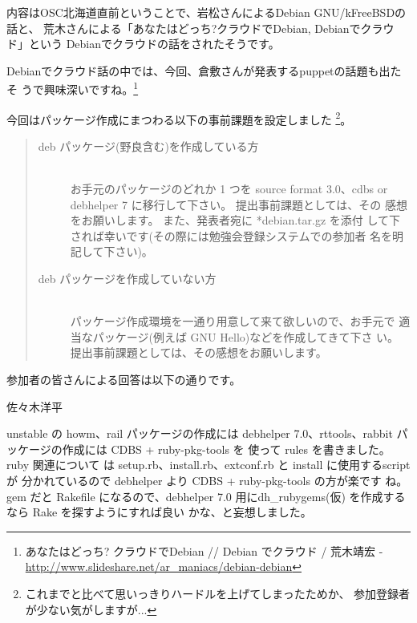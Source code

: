 \documentclass[mingoth,a4paper]{jsarticle}
\begin{document}
内容はOSC北海道直前ということで、岩松さんによるDebian GNU/kFreeBSDの話と、
荒木さんによる「あなたはどっち?クラウドでDebian, Debianでクラウド」という
Debianでクラウドの話をされたそうです。

Debianでクラウド話の中では、今回、倉敷さんが発表するpuppetの話題も出たそ
うで興味深いですね。\footnote{あなたはどっち? クラウドでDebian // Debian
でクラウド / 荒木靖宏 -
\url{http://www.slideshare.net/ar\_maniacs/debian-debian} }



今回はパッケージ作成にまつわる以下の事前課題を設定しました
\footnote{%
これまでと比べて思いっきりハードルを上げてしまったためか、
参加登録者が少ない気がしますが...}。
\begin{quote}
    \begin{screen}
        \begin{description}
              \item [deb パッケージ(野良含む)を作成している方]　\\
            お手元のパッケージのどれか 1 つを source format 3.0、cdbs
            or debhelper 7 に移行して下さい。 提出事前課題としては、その
            感想をお願いします。 また、発表者宛に *debian.tar.gz を添付
            して下されば幸いです(その際には勉強会登録システムでの参加者
            名を明記して下さい)。
              \item [deb パッケージを作成していない方]　\\
            パッケージ作成環境を一通り用意して来て欲しいので、お手元で
            適当なパッケージ(例えば GNU Hello)などを作成してきて下さ
            い。 提出事前課題としては、その感想をお願いします。
        \end{description}
    \end{screen}
\end{quote}

参加者の皆さんによる回答は以下の通りです。

\begin{prework}{ 佐々木洋平 }

    unstable の howm、rail パッケージの作成には debhelper
    7.0、rttools、rabbit パッケージの作成には CDBS + ruby-pkg-tools を
    使って rules を書きました。  ruby 関連について
    は setup.rb、install.rb、extconf.rb と install に使用するscript が
    分かれているので debhelper より CDBS + ruby-pkg-tools の方が楽です
    ね。 gem だと Rakefile になるので、debhelper
    7.0 用にdh\_rubygems(仮) を作成するなら Rake を探すようにすれば良い
    かな、と妄想しました。

\end{prework}
\end{document}
